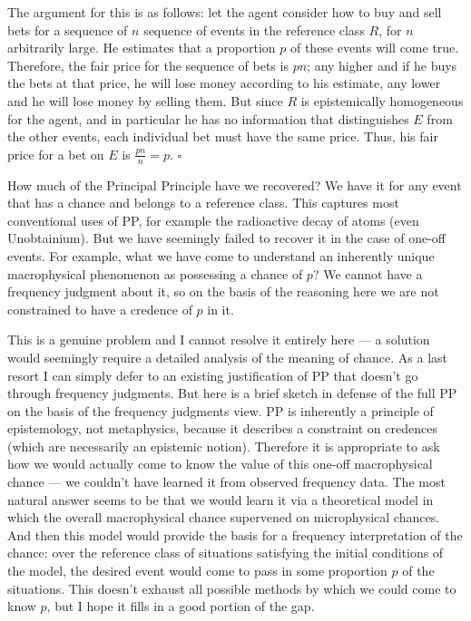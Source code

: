 \documentclass[letterpaper,12pt]{article}
\begin{document}
The argument for this is as follows: let the agent consider how to buy and sell bets for a sequence of $n$ sequence of events in the reference class $R$, for $n$ arbitrarily large. He estimates that a proportion $p$ of these events will come true. Therefore, the fair price for the sequence of bets is $pn$; any higher and if he buys the bets at that price, he will lose money according to his estimate, any lower and he will lose money by selling them. But since $R$ is epistemically homogeneous for the agent, and in particular he has no information that distinguishes $E$ from the other events, each individual bet must have the same price. Thus, his fair price for a bet on $E$ is $\frac{pn}{n} = p$. $\square$

How much of the Principal Principle have we recovered? We have it for any event that has a chance and belongs to a reference class. This captures most conventional uses of PP, for example the radioactive decay of atoms (even Unobtainium). But we have seemingly failed to recover it in the case of one-off events. For example, what we have come to understand an inherently unique macrophysical phenomenon as possessing a chance of $p$? We cannot have a frequency judgment about it, so on the basis of the reasoning here we are not constrained to have a credence of $p$ in it.

This is a genuine problem and I cannot resolve it entirely here --- a solution would seemingly require a detailed analysis of the meaning of chance. As a last resort I can simply defer to an existing justification of PP that doesn't go through frequency judgments. But here is a brief sketch in defense of the full PP on the basis of the frequency judgments view. PP is inherently a principle of epistemology, not metaphysics, because it describes a constraint on credences (which are necessarily an epistemic notion). Therefore it is appropriate to ask how we would actually come to know the value of this one-off macrophysical chance --- we couldn't have learned it from observed frequency data. The most natural answer seems to be that we would learn it via a theoretical model in which the overall macrophysical chance supervened on microphysical chances. And then this model would provide the basis for a frequency interpretation of the chance: over the reference class of situations satisfying the initial conditions of the model, the desired event would come to pass in some proportion $p$ of the situations. This doesn't exhaust all possible methods by which we could come to know $p$, but I hope it fills in a good portion of the gap.
\end{document}
